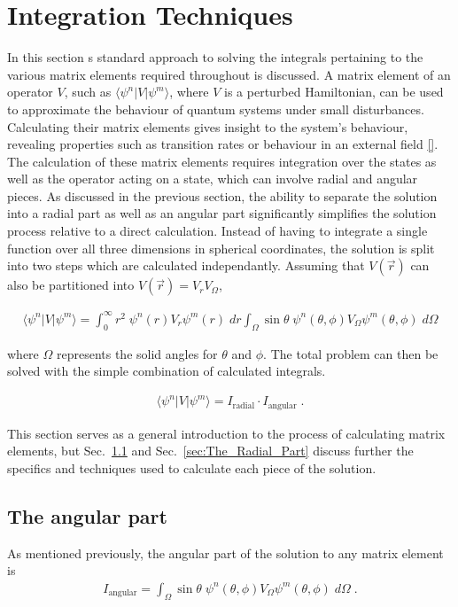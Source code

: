     \section{Integration Techniques} \label{sec:Integration_Techniques}
        In this section s standard approach to solving the integrals pertaining to the various matrix elements required throughout is discussed. A matrix element of an operator $V$, such as $\langle\psi^n \vert V \vert \psi^m \rangle$, where $V$ is a perturbed Hamiltonian, can be used to approximate the behaviour of quantum systems under small disturbances. Calculating their matrix elements gives insight to the system's behaviour, revealing properties such as transition rates or behaviour in an external field \ref{}. The calculation of these matrix elements requires integration over the states as well as the operator acting on a state, which can involve radial and angular pieces. As discussed in the previous section, the ability to separate the solution into a radial part as well as an angular part significantly simplifies the solution process relative to a direct calculation. Instead of having to integrate a single function over all three dimensions in spherical coordinates, the solution is split into two steps which are calculated independantly. Assuming that $V(\vec{r})$ can also be partitioned into $V(\vec{r}) = V_r V_\Omega$,

        \begin{align}
            \langle \psi^n \vert V \vert \psi^m \rangle = \int_{0}^{\infty} r^2 \; \psi^n(r) V_r \psi^m(r) \; dr \int_\Omega \sin \theta \; \psi^n(\theta, \phi) V_\Omega \psi^m(\theta, \phi) \; d\Omega
        \end{align}

        \noindent where $\Omega$ represents the solid angles for $\theta$ and $\phi$. The total problem can then be solved with the simple combination of calculated integrals.

        \begin{align}
             \langle \psi^n \vert V \vert \psi^m \rangle = I_{\text{radial}} \cdot I_{\text{angular}}\;.
        \end{align}

        This section serves as a general introduction to the process of calculating matrix elements, but Sec.~\ref{sec:The_Angular_Part} and Sec.~\ref{sec:The_Radial_Part} discuss further the specifics and techniques used to calculate each piece of the solution.

        \subsection{The angular part} \label{sec:The_Angular_Part}
        As mentioned previously, the angular part of the solution to any matrix element is
        \begin{align}
            I_{\text{angular}} = \int_\Omega \sin \theta \; \psi^n(\theta, \phi) V_\Omega \psi^m(\theta, \phi) \; d\Omega\;. \label{eq:hydrogen_spherical_harmonic}
        \end{align}

